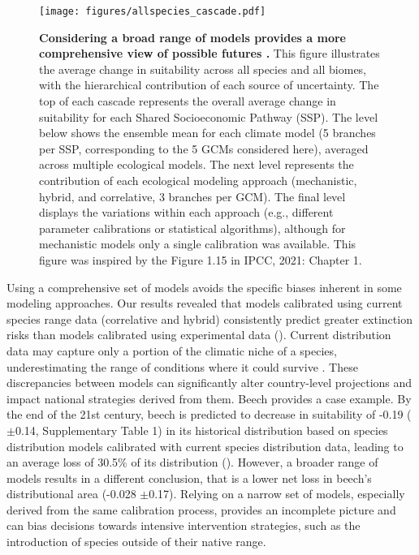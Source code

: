 \documentclass[11pt,letter]{article}
\begin{document}
\begin{figure}
	\centering
	\texttt{[image: figures/allspecies\_cascade.pdf]}
	\caption{\textbf{Considering a broad range of models provides a more comprehensive view of possible futures .} This figure illustrates the average change in suitability across all species and all biomes, with the hierarchical contribution of each source of uncertainty. The top of each cascade represents the overall average change in suitability for each Shared Socioeconomic Pathway (SSP). The level below shows the ensemble mean for each climate model (5 branches per SSP, corresponding to the 5 GCMs considered here), averaged across multiple ecological models. The next level represents the contribution of each ecological modeling approach (mechanistic, hybrid, and correlative, 3 branches per GCM). The final level displays the variations within each approach (e.g., different parameter calibrations or statistical algorithms), although for mechanistic models only a single calibration was available. This figure was inspired by the Figure 1.15 in IPCC, 2021: Chapter 1.}
	\label{fig:cascade}
\end{figure}

Using a comprehensive set of models avoids the specific biases inherent in some modeling approaches. Our results revealed that models calibrated using current species range data (correlative and hybrid) consistently predict greater extinction risks than models calibrated using experimental data (). 
Current distribution data may capture only a portion of the climatic niche of a species, underestimating the range of conditions where it could survive \citep{Chevalier2024, NoguesBravo2016}.
These discrepancies between models can significantly alter country-level projections and impact national strategies derived from them. 
Beech provides a case example. By the end of the 21st century, beech is predicted to decrease in  suitability of -0.19 ($\pm$0.14, Supplementary Table 1) in its historical distribution based on species distribution models calibrated with current species distribution data, leading to an average loss of 30.5\% of its distribution (). However, a broader range of models results in a different conclusion, that is a lower net loss in beech's distributional area (-0.028 $\pm$0.17).
Relying on a narrow set of models, especially derived from the same calibration process, provides an incomplete picture \citep{Dawson2011} and can bias decisions towards intensive intervention strategies, such as the introduction of species outside of their native range.
\end{document}

